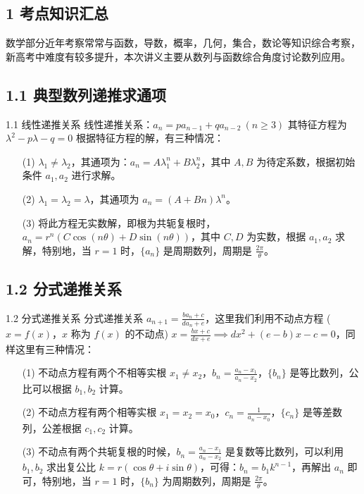 \documentclass{ctexart}
\begin{document}
\thispagestyle{fancy} %

\begin{center}
    \section*{1 考点知识汇总}
\end{center}

\noindent
数学部分近年考察常常与函数，导数，概率，几何，集合，数论等知识综合考察，新高考中难度有较多提升，本次讲义主要从数列与函数综合角度讨论数列应用。

\subsection*{1.1 典型数列递推求通项}

\begin{purpletheorem}{1.1 线性递推关系}
线性递推关系：$a_n = pa_{n-1} + qa_{n-2} \ (n \ge 3)$ 其特征方程为$\lambda^2 - p\lambda - q = 0$ 根据特征方程的解，有三种情况：
\begin{enumerate}
    \item[(1)] $\lambda_1 \neq \lambda_2$，其通项为：$a_n = A\lambda_1^n + B\lambda_2^n$，其中 $A, B$ 为待定系数，根据初始条件 $a_1, a_2$ 进行求解。
    \item[(2)] $\lambda_1 = \lambda_2 = \lambda$，其通项为 $a_n = (A+Bn)\lambda^n$。
    \item[(3)] 将此方程无实数解，即根为共轭复根时，$a_n = r^n(C\cos(n\theta) + D\sin(n\theta))$，其中 $C, D$ 为实数，根据 $a_1, a_2$ 求解，特别地，当 $r=1$ 时，$\{a_n\}$ 是周期数列，周期是 $\displaystyle \frac{2\pi}{\theta}$。
\end{enumerate}
\end{purpletheorem}

\subsection*{1.2 分式递推关系}

\begin{purpletheorem}{1.2 分式递推关系}
分式递推关系 $a_{n+1} = \displaystyle\frac{ba_n+c}{da_n+e}$，这里我们利用不动点方程 ($x = f(x)$，$x$ 称为 $f(x)$ 的不动点) $x = \displaystyle\frac{bx+c}{dx+e} \implies dx^2 + (e-b)x - c = 0$，同样这里有三种情况：
\begin{enumerate}
    \item[(1)] 不动点方程有两个不相等实根 $x_1 \neq x_2$，$b_n = \displaystyle\frac{a_n - x_1}{a_n - x_2}$，$\{b_n\}$ 是等比数列，公比可以根据 $b_1, b_2$ 计算。
    \item[(2)] 不动点方程有两个相等实根 $x_1 = x_2 = x_0$，$c_n = \displaystyle\frac{1}{a_n - x_0}$，$\{c_n\}$ 是等差数列，公差根据 $c_1, c_2$ 计算。
    \item[(3)] 不动点有两个共轭复根的时候，$b_n = \displaystyle\frac{a_n - x_1}{a_n - x_2}$ 是复数等比数列，可以利用 $b_1, b_2$ 求出复公比 $k = r(\cos\theta + i\sin\theta)$，可得：$b_n = b_1 k^{n-1}$，再解出 $a_n$ 即可，特别地，当 $r=1$ 时，$\{b_n\}$ 为周期数列，周期是 $\displaystyle\frac{2\pi}{\theta}$。
\end{enumerate}
\end{purpletheorem}
\end{document}

